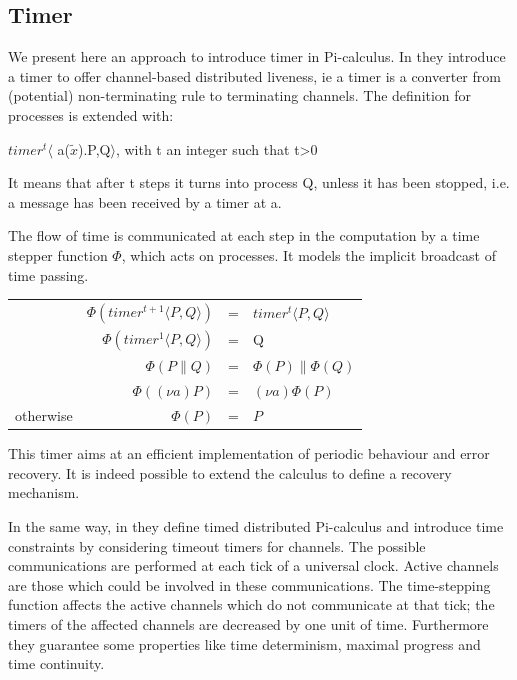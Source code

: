 \documentclass[a4paper,11pt,twoside]{report}
\newcommand{\Ia}{\ensuremath{a}}
\newcommand{\PP}{\ensuremath{P}}
\newcommand{\nuc}[2]{\ensuremath{(\nu #1)#2}}
\begin{document}
\subsection{Timer}
We present here an approach to introduce timer in Pi-calculus. In \cite{berger2007timed,berger2002towards} they introduce a timer to offer channel-based distributed liveness, ie a timer is a converter from (potential) non-terminating rule to terminating channels. The definition for processes is extended with:
\begin{center}
$timer^{t}\langle$ a($\tilde{x}$).P,Q$\rangle $, with t an integer such that t>0
\end{center}
It means that after t  steps it turns into process Q, unless it has been stopped, i.e. a message has been received by a timer at a.

The flow of time is communicated at each step in the computation by a time stepper function $\Phi$, which acts on processes. It models the implicit broadcast of time passing.
\begin{center}
\begin{tabular}{lrcl}
 &$\Phi ( timer^{t+1}\langle \PP, Q \rangle)$ & = & $timer^{t}\langle \PP, Q \rangle$ \\
 &$\Phi ( timer^{1}\langle \PP, Q \rangle)$ & = & Q \\
 &$\Phi (\PP \| Q)$ & = & $\Phi (\PP) \| \Phi (Q) $\\
 &$\Phi ( \nuc{\Ia}{\PP} )$ & = & $\nuc{\Ia}{ \Phi (\PP)}$\\
otherwise& $\Phi (\PP) $ & = & \PP\\
\end{tabular}
\end{center}

This timer aims at an efficient implementation of periodic behaviour and error recovery. It is indeed possible to extend the calculus to define a recovery mechanism.

In the same way, in \cite{ciobanu2006timers} they define timed distributed Pi-calculus  and introduce time constraints by considering timeout timers for channels. The possible communications are performed at each tick of a universal clock. Active channels are those which could be involved in these communications. The time-stepping function affects the active channels which do not communicate at that tick; the timers of the affected channels are decreased by one unit of time. Furthermore they guarantee some properties like time determinism, maximal progress and time continuity.
\end{document}
